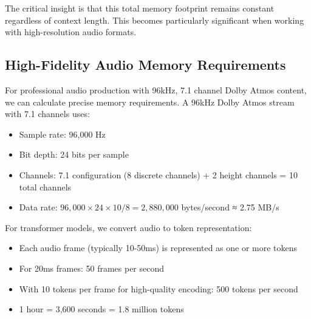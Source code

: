 The critical insight is that this total memory footprint remains constant regardless of context length. This becomes particularly significant when working with high-resolution audio formats.

\subsection{High-Fidelity Audio Memory Requirements}

For professional audio production with 96kHz, 7.1 channel Dolby Atmos content, we can calculate precise memory requirements. A 96kHz Dolby Atmos stream with 7.1 channels uses:

\begin{itemize}
    \item Sample rate: 96,000 Hz
    \item Bit depth: 24 bits per sample
    \item Channels: 7.1 configuration (8 discrete channels) + 2 height channels = 10 total channels
    \item Data rate: $96,000 \times 24 \times 10 / 8 = 2,880,000$ bytes/second ≈ 2.75 MB/s
\end{itemize}

For transformer models, we convert audio to token representation:
\begin{itemize}
    \item Each audio frame (typically 10-50ms) is represented as one or more tokens
    \item For 20ms frames: 50 frames per second
    \item With 10 tokens per frame for high-quality encoding: 500 tokens per second
    \item 1 hour = 3,600 seconds = 1.8 million tokens
\end{itemize}

